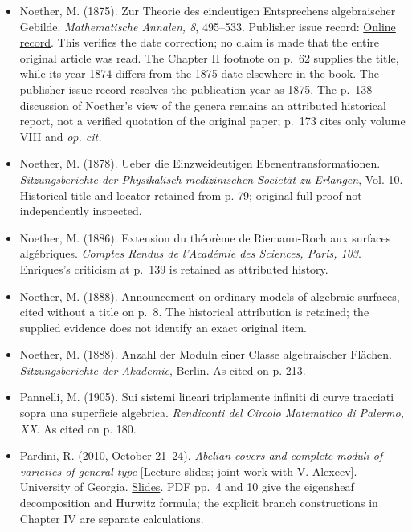 \begin{sloppypar}
\begin{itemize}
\item Noether, M. (1875). Zur Theorie des eindeutigen Entsprechens algebraischer Gebilde. \emph{Mathematische Annalen, 8}, 495--533. Publisher issue record: \href{https://link.springer.com/journal/208/volumes-and-issues/8-4}{Online record}. This verifies the date correction; no claim is made that the entire original article was read. The Chapter II footnote on p.~62 supplies the title, while its year 1874 differs from the 1875 date elsewhere in the book. The publisher issue record resolves the publication year as 1875. The p.~138 discussion of Noether's view of the genera remains an attributed historical report, not a verified quotation of the original paper; p.~173 cites only volume VIII and \emph{op. cit.}

\item Noether, M. (1878). Ueber die Einzweideutigen Ebenentransformationen. \emph{Sitzungsberichte der Physikalisch-medizinischen Societ\"at zu Erlangen}, Vol. 10. Historical title and locator retained from p. 79; original full proof not independently inspected.

\item Noether, M. (1886). Extension du théorème de Riemann-Roch aux surfaces algébriques. \emph{Comptes Rendus de l'Académie des Sciences, Paris, 103}. Enriques's criticism at p.~139 is retained as attributed history.

\item Noether, M. (1888). Announcement on ordinary models of algebraic surfaces, cited without a title on p.~8. The historical attribution is retained; the supplied evidence does not identify an exact original item.

\item Noether, M. (1888). Anzahl der Moduln einer Classe algebraischer Fl\"achen. \emph{Sitzungsberichte der Akademie}, Berlin. As cited on p. 213.

\item Pannelli, M. (1905). Sui sistemi lineari triplamente infiniti di curve tracciati sopra una superficie algebrica. \emph{Rendiconti del Circolo Matematico di Palermo, XX}. As cited on p. 180.

\item Pardini, R. (2010, October 21--24). \emph{Abelian covers and complete moduli of varieties of general type} {[}Lecture slides; joint work with V. Alexeev{]}. University of Georgia. \href{https://pagine.dm.unipi.it/pardini/files/UGA10B.pdf}{Slides}. PDF pp.~4 and 10 give the eigensheaf decomposition and Hurwitz formula; the explicit branch constructions in Chapter IV are separate calculations.


\end{itemize}
\end{sloppypar}
